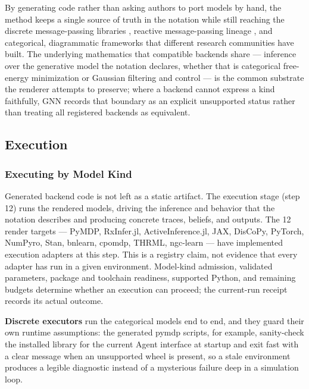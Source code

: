 \documentclass[
  english,
  9pt,
]{extarticle}
\begin{document}
By generating code rather than asking authors to port models by hand,
the method keeps a single source of truth in the notation while still
reaching the discrete message-passing libraries \citep{heins2022},
reactive message-passing lineage
\citep{bagaev2021reactiveMessagePassing}, and categorical, diagrammatic
frameworks \citep{defelice2021} that different research communities have
built. The underlying mathematics that compatible backends share ---
inference over the generative model the notation declares, whether that
is categorical free-energy minimization \citep{dacosta2020, smith2022}
or Gaussian filtering and control --- is the common substrate the
renderer attempts to preserve; where a backend cannot express a kind
faithfully, GNN records that boundary as an explicit unsupported status
rather than treating all registered backends as equivalent.

\subsection{Execution}\label{execution}

\subsubsection{Executing by Model Kind}\label{executing-by-model-kind}

Generated backend code is not left as a static artifact. The execution
stage (step 12) runs the rendered models, driving the inference and
behavior that the notation describes and producing concrete traces,
beliefs, and outputs. The 12 render targets --- PyMDP, RxInfer.jl,
ActiveInference.jl, JAX, DisCoPy, PyTorch, NumPyro, Stan, bnlearn,
cpomdp, THRML, ngc-learn --- have implemented execution adapters at this
step. This is a registry claim, not evidence that every adapter has run
in a given environment. Model-kind admission, validated parameters,
package and toolchain readiness, supported Python, and remaining budgets
determine whether an execution can proceed; the current-run receipt
records its actual outcome.

\textbf{Discrete executors} run the categorical models end to end, and
they guard their own runtime assumptions: the generated pymdp scripts,
for example, sanity-check the installed library for the current Agent
interface at startup and exit fast with a clear message when an
unsupported wheel is present, so a stale environment produces a legible
diagnostic instead of a mysterious failure deep in a simulation loop.
\end{document}
